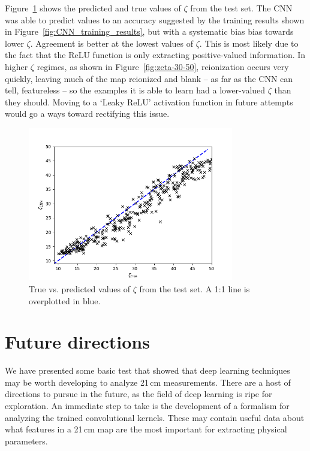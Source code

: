 Figure~\ref{fig:compare-zeta} shows the predicted and true values of $\zeta$ from the test set. The CNN was able to predict values to an accuracy suggested by the training results shown in Figure~\ref{fig:CNN_training_results}, but with a systematic bias bias towards lower $\zeta$. Agreement is better at the lowest values of $\zeta$. This is most likely due to the fact that the ReLU function is only extracting positive-valued information. In higher $\zeta$ regimes, as shown in Figure~\ref{fig:zeta-30-50}, reionization occurs very quickly, leaving much of the map reionized and blank -- as far as the CNN can tell, featureless -- so the examples it is able to learn had a lower-valued $\zeta$ than they should. Moving to a `Leaky ReLU' activation function in future attempts would go a ways toward rectifying this issue.

\begin{figure}
\centering
\includegraphics[width=0.8\textwidth]{chapters/hera_ml/figures/CompareZeta.png}
\caption[True vs. predicted values of $\zeta$ from the test set.]{True vs. predicted values of $\zeta$ from the test set. A 1:1 line is overplotted in blue.}
\label{fig:compare-zeta}
\end{figure}

\section{Future directions}

We have presented some basic test that showed that deep learning techniques may be worth developing to analyze 21\,cm measurements. There are a host of directions to pursue in the future, as the field of deep learning is ripe for exploration. An immediate step to take is the development of a formalism for analyzing the trained convolutional kernels. These may contain useful data about what features in a 21\,cm map are the most important for extracting physical parameters. 


